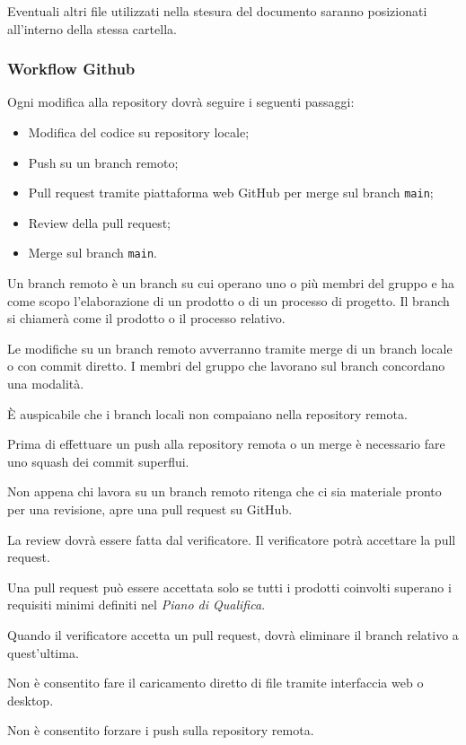 \documentclass[a4paper, 12pt]{article}
\begin{document}
Eventuali altri file utilizzati nella stesura del documento saranno posizionati all'interno della stessa cartella.

\subsubsection{Workflow Github}

Ogni modifica alla repository dovrà seguire i seguenti passaggi:
\begin{itemize}
\item Modifica del codice su repository locale;
\item Push su un branch remoto;
\item Pull request tramite piattaforma web GitHub per merge sul branch \texttt{main};
\item Review della pull request;
\item Merge sul branch \texttt{main}.
\end{itemize}

Un branch remoto è un branch su cui operano uno o più membri del gruppo e ha come scopo l'elaborazione di un prodotto o di un processo di progetto. Il branch si chiamerà come il prodotto o il processo relativo.

Le modifiche su un branch remoto avverranno tramite merge di un branch locale o con commit diretto. I membri del gruppo che lavorano sul branch concordano una modalità.

È auspicabile che i branch locali non compaiano nella repository remota.

Prima di effettuare un push alla repository remota o un merge è necessario fare uno squash dei commit superflui.

Non appena chi lavora su un branch remoto ritenga che ci sia materiale pronto per una revisione, apre una pull request su GitHub.

La review dovrà essere fatta dal verificatore. Il verificatore potrà accettare la pull request.

Una pull request può essere accettata solo se tutti i prodotti coinvolti superano i requisiti minimi definiti nel \textit{Piano di Qualifica}.

Quando il verificatore accetta un pull request, dovrà eliminare il branch relativo a quest'ultima.

Non è consentito fare il caricamento diretto di file tramite interfaccia web o desktop.

Non è consentito forzare i push sulla repository remota.	
\end{document}
